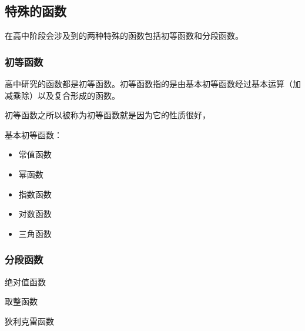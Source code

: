 \subsection{特殊的函数}

在高中阶段会涉及到的两种特殊的函数包括初等函数和分段函数。

\subsubsection{初等函数}

高中研究的函数都是初等函数。初等函数指的是由基本初等函数经过基本运算（加减乘除）以及复合形成的函数。

初等函数之所以被称为初等函数就是因为它的性质很好，

基本初等函数：
\begin{itemize}
\item 常值函数
\item 幂函数
\item 指数函数
\item 对数函数
\item 三角函数
\end{itemize}

\subsubsection{分段函数}

绝对值函数

取整函数

狄利克雷函数